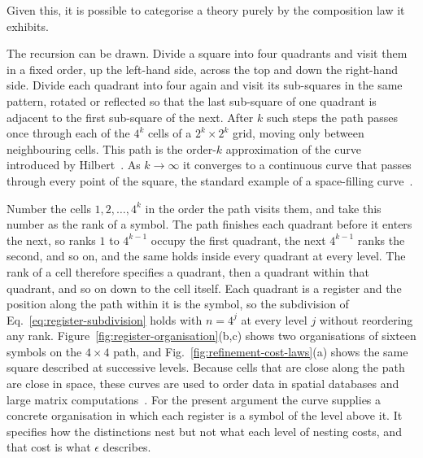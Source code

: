 Given this, it is possible to categorise a theory purely by the composition law it exhibits. 

The recursion can be drawn. Divide a square into four quadrants and
visit them in a fixed order, up the left-hand side, across the top and
down the right-hand side. Divide each quadrant into four again and
visit its sub-squares in the same pattern, rotated or reflected so that
the last sub-square of one quadrant is adjacent to the first sub-square
of the next. After $k$ such steps the path passes once through each of
the $4^k$ cells of a $2^k\times2^k$ grid, moving only between
neighbouring cells. This path is the order-$k$ approximation of the
curve introduced by Hilbert~\cite{hilbert1891stetige}. As $k\to\infty$
it converges to a continuous curve that passes through every point of
the square, the standard example of a space-filling
curve~\cite{haverkort2011inventory}.

Number the cells $1,2,\dots,4^k$ in the order the path visits them, and
take this number as the rank of a symbol. The path finishes each
quadrant before it enters the next, so ranks $1$ to $4^{k-1}$ occupy the
first quadrant, the next $4^{k-1}$ ranks the second, and so on, and the
same holds inside every quadrant at every level. The rank of a cell
therefore specifies a quadrant, then a quadrant within that quadrant,
and so on down to the cell itself. Each quadrant is a register and the
position along the path within it is the symbol, so the subdivision of
Eq.~\eqref{eq:register-subdivision} holds with $n=4^{j}$ at every level
$j$ without reordering any rank. Figure~\ref{fig:register-organisation}(b,c)
shows two organisations of sixteen symbols on the $4\times4$ path, and
Fig.~\ref{fig:refinement-cost-laws}(a) shows the same square described
at successive levels. Because cells that are close along the path are
close in space, these curves are used to order data in spatial
databases and large matrix computations~\cite{haverkort2011inventory}.
For the present argument the curve supplies a concrete organisation in
which each register is a symbol of the level above it. It specifies how
the distinctions nest but not what each level of nesting costs, and
that cost is what $\epsilon$ describes.

